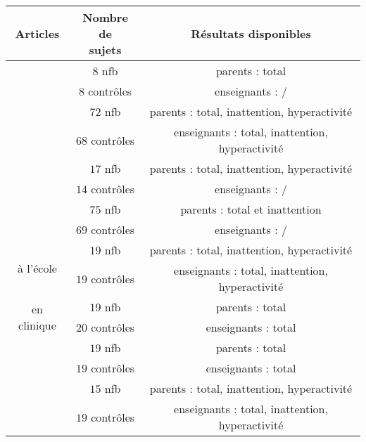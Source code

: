 \begin{tabular}{ccc}
\toprule
Articles & \shortstack{ Nombre de \\ sujets} & Résultats disponibles \\
\toprule
\multirow{2}{*}{ \citet{Baumeister2016} } & $8$ \gls{nfb} & parents : total \\
                                          & $8$ contrôles & enseignants : / \\		
\midrule
\multirow{2}{*}{ \citet{Strehl2017} } & $72$ \gls{nfb} & parents : total, inattention, hyperactivité \\
                                      & $68$ contrôles & enseignants : total, inattention, hyperactivité \\		
\midrule
\multirow{2}{*}{ \citet{Bazanova2018} } & $17$ \gls{nfb} & parents : total, inattention, hyperactivité \\
                                        & $14$ contrôles & enseignants : / \\		
\midrule
\multirow{2}{*}{ \citet{Aggensteiner2019} } & $75$ \gls{nfb} & parents : total et inattention \\
                                          & $69$ contrôles & enseignants : / \\		
\midrule
\multirow{2}{*}{ \citet{Minder2018} à l'école } & $19$ \gls{nfb} & parents : total, inattention, hyperactivité \\
                                      & $19$ contrôles & enseignants : total, inattention, hyperactivité \\ 
\midrule
\multirow{2}{*}{ \citet{Minder2018} en clinique } & $19$ \gls{nfb} & parents : total \\
                                                  & $20$ contrôles & enseignants : total \\
\midrule
\multirow{2}{*}{ \citet{Moreno2019} } & $19$ \gls{nfb} & parents : total \\
                                                  & $19$ contrôles & enseignants : total \\
\midrule
\multirow{2}{*}{ \citet{Shereena2019} } & $15$ \gls{nfb} & parents : total, inattention, hyperactivité \\
                                      & $19$ contrôles & enseignants : total, inattention, hyperactivité \\
\bottomrule
\end{tabular}
